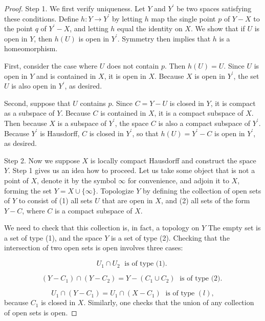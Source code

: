 \begin{proof}
Step 1. We first verify uniqueness. Let \(Y\) and \(Y^{\prime }\) be two spaces satisfying these conditions. Define \(h : Y \rightarrow {Y}^{\prime }\) by letting \(h\) map the single point \(p\) of \(Y - X\) to the point \(q\) of \(Y^{\prime } - X\), and letting \(h\) equal the identity on \(X\). We show that if \(U\) is open in \(Y\), then \(h( U)\) is open in \(Y^{\prime }\). Symmetry then implies that \(h\) is a homeomorphism.

First, consider the case where \(U\) does not contain \(p\). Then \(h( U) = U\). Since \(U\) is open in \(Y\) and is contained in \(X\), it is open in \(X\). Because \(X\) is open in \(Y^{\prime }\), the set \(U\) is also open in \(Y^{\prime }\), as desired.

Second, suppose that \(U\) contains \(p\). Since \(C = Y - U\) is closed in \(Y\), it is compact as a subspace of \(Y\). Because \(C\) is contained in \(X\), it is a compact subspace of \(X\). Then because \(X\) is a subspace of \(Y^{\prime }\), the space \(C\) is also a compact subspace of \(Y^{\prime }\). Because \(Y^{\prime }\) is Hausdorff, \(C\) is closed in \(Y^{\prime }\), so that \(h( U) = Y^{\prime } - C\) is open in \(Y^{\prime }\), as desired.

Step 2. Now we suppose \(X\) is locally compact Hausdorff and construct the space \(Y\). Step 1 gives us an idea how to proceed. Let us take some object that is not a point of \(X\), denote it by the symbol \(\infty\) for convenience, and adjoin it to \(X\), forming the set \(Y = X \cup \{ \infty \}\). Topologize \(Y\) by defining the collection of open sets of \(Y\) to consist of (1) all sets \(U\) that are open in \(X\), and (2) all sets of the form \(Y - C\), where \(C\) is a compact subspace of \(X\).

We need to check that this collection is, in fact, a topology on \(Y\) The empty set is a set of type (1), and the space \(Y\) is a set of type (2). Checking that the intersection of two open sets is open involves three cases:

\[
U_{1} \cap {U}_{2}\;\text{ is of type (1). }
\]

\[
( {Y - C_{1}}) \cap ( {Y - C_{2}}) = Y - ( {C_{1} \cup {C}_{2}}) \;\text{ is of type (2). }
\]

\[
U_{1} \cap ( {Y - C_{1}}) = U_{1} \cap ( {X - C_{1}}) \;\text{ is of type }( l),
\]
because \(C_{1}\) is closed in \(X\). Similarly, one checks that the union of any collection of open sets is open.


\end{proof}
